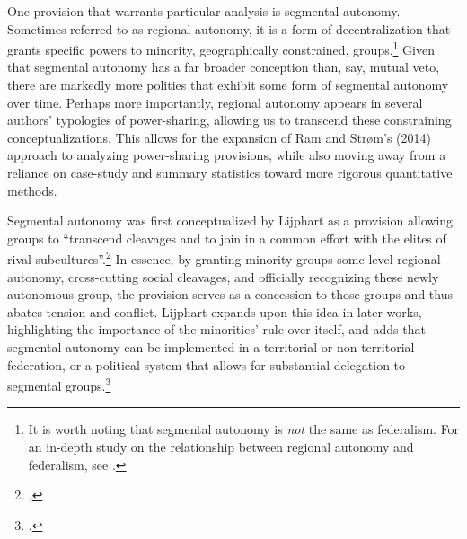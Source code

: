 \documentclass[12pt]{article}
\begin{document}
One provision that warrants particular analysis is segmental autonomy. Sometimes referred to as regional autonomy, it is a form of decentralization that grants specific powers to minority, geographically constrained, groups.\footnote{It is worth noting that segmental autonomy is \textit{not} the same as federalism. For an in-depth study on the relationship between regional autonomy and federalism, see \cite{lluch_autonomism_2012}.} Given that segmental autonomy has a far broader conception than, say, mutual veto, there are markedly more polities that exhibit some form of segmental autonomy over time. Perhaps more importantly, regional autonomy appears in several authors' typologies of power-sharing, allowing us to transcend these constraining conceptualizations. This allows for the expansion of Ram and Strøm's (2014) approach to analyzing power-sharing provisions, while also moving away from a reliance on case-study and summary statistics toward more rigorous quantitative methods.

Segmental autonomy was first conceptualized by Lijphart as a provision allowing groups to ``transcend cleavages and to join in a common effort with the elites of rival subcultures''.\footcite[216]{lijphart_consociational_1969} In essence, by granting minority groups some level regional autonomy, cross-cutting social cleavages, and officially recognizing these newly autonomous group, the provision serves as a concession to those groups and thus abates tension and conflict. Lijphart expands upon this idea in later works, highlighting the importance of the minorities’ rule over itself, and adds that segmental autonomy can be implemented in a territorial or non-territorial federation, or a political system that allows for substantial delegation to segmental groups.\footcite{lijphart_consociational_1977, lijphart_non-majoritarian_1985} 
\end{document}
